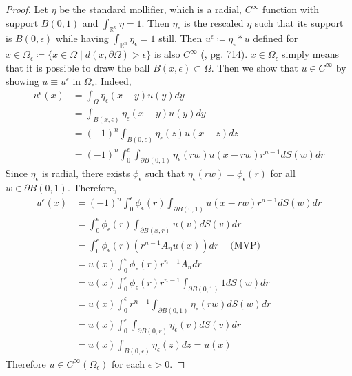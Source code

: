 \documentclass[openany, amssymb, psamsfonts]{amsart}
\theoremstyle{definition}
\numberwithin{equation}{section}
\newcommand{\bbr}{\mathbb{R}}
\begin{document}
\begin{proof}
Let $\eta$ be the standard mollifier, which is a radial, $C^\infty$ function with support $B(0, 1)$ and $\int_{\bbr^n} \eta = 1$. Then $\eta_\epsilon$ is the rescaled $\eta$ such that its support is $B(0, \epsilon)$ while having $\int_{\bbr^n} \eta_\epsilon = 1$ still. Then $u^\epsilon \coloneqq \eta_\epsilon * u$ defined for $x \in \Omega_\epsilon \coloneqq \{x \in \Omega \mid d(x, \partial \Omega) > \epsilon\}$ is also $C^\infty$ (\cite{Evans}, pg. 714). $x \in \Omega_\epsilon$ simply means that it is possible to draw the ball $B(x, \epsilon) \subset \Omega$. Then we show that $u \in C^\infty$ by showing $u \equiv u^\epsilon$ in $\Omega_\epsilon$. Indeed, 
\begin{align*}
u^\epsilon(x) &= \int_{\Omega} \eta_\epsilon(x-y) u(y) dy \\
&= \int_{B(x, \epsilon)}  \eta_\epsilon(x-y) u(y) dy \\
&= (-1)^n \int_{B(0, \epsilon)} \eta_\epsilon(z) u(x - z) dz \\
&= (-1)^n \int_{0}^{\epsilon} \int_{\partial B(0, 1)} \eta_\epsilon(rw)  u(x - rw) r^{n-1} dS(w) dr
\end{align*}
Since $\eta_\epsilon$ is radial, there exists $\phi_\epsilon$ such that $\eta_\epsilon(rw) = \phi_\epsilon(r)$ for all $w \in \partial B(0, 1)$. Therefore,
\begin{align*}
    u^\epsilon(x) &= (-1)^n \int_{0}^{\epsilon} \phi_\epsilon(r) \int_{\partial B(0, 1)} u(x - rw) r^{n-1} dS(w) dr \\
    &= \int_{0}^{\epsilon} \phi_\epsilon(r) \int_{\partial B(x, r)} u(v) dS(v) dr \\
    &= \int_{0}^{\epsilon} \phi_\epsilon(r) (r^{n-1} A_n u(x)) dr \quad \:\text{(MVP)}\:\\
    &= u(x) \int_{0}^{\epsilon} \phi_\epsilon(r) r^{n-1} A_n dr \\
    &= u(x) \int_{0}^{\epsilon} \phi_\epsilon(r) r^{n-1}\int_{\partial B(0, 1)} 1 dS(w) dr \\
    &= u(x) \int_{0}^{\epsilon} r^{n-1} \int_{\partial B(0, 1)} \eta_\epsilon(rw) dS(w) dr \\
    &= u(x) \int_{0}^{\epsilon} \int_{\partial B(0, r)} \eta_\epsilon(v) dS(v) dr \\
    &= u(x) \int_{B(0, \epsilon)} \eta_\epsilon(z) dz= u(x)
\end{align*}
Therefore $u \in C^\infty(\Omega_\epsilon)$ for each $\epsilon > 0$.
\end{proof}
\end{document}
